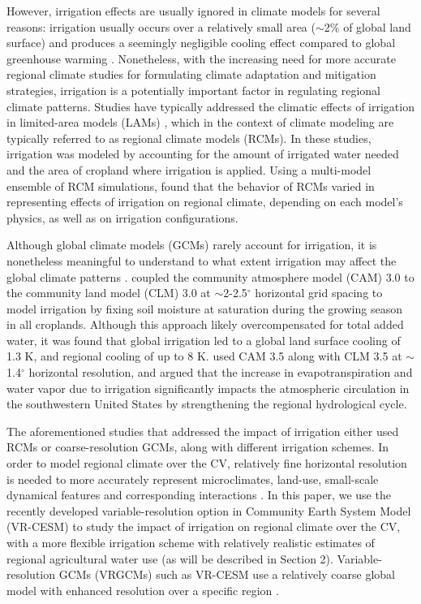 \documentclass[draft,ms]{agutex}   %
\begin{document}
\begin{article}
However, irrigation effects are usually ignored in climate models for several reasons: irrigation usually occurs over a relatively small area ($\sim$2$\%$ of global land surface) and produces a seemingly negligible cooling effect compared to global greenhouse warming \citep{boucher2004direct}. Nonetheless, with the increasing need for more accurate regional climate studies for formulating climate adaptation and mitigation strategies, irrigation is a potentially important factor in regulating regional climate patterns. Studies have typically addressed the climatic effects of irrigation in limited-area models (LAMs) \citep{snyder2006regional, kueppers2007irrigation}, which in the context of climate modeling are typically referred to as regional climate models (RCMs). In these studies, irrigation was modeled by accounting for the amount of irrigated water needed and the area of cropland where irrigation is applied. Using a multi-model ensemble of RCM simulations, \cite{kueppers2008seasonal} found that the behavior of RCMs varied in representing effects of irrigation on regional climate, depending on each model's physics, as well as on irrigation configurations.

Although global climate models (GCMs) rarely account for irrigation, it is nonetheless meaningful to understand to what extent irrigation may affect the global climate patterns \citep{sacks2009effects}. \citet{lobell2006biogeophysical} coupled the community atmosphere model (CAM) 3.0 to the community land model (CLM) 3.0 at $\sim$2-2.5$^\circ$ horizontal grid spacing to model irrigation by fixing soil moisture at saturation during the growing season in all croplands. Although this approach likely overcompensated for total added water, it was found that global irrigation led to a global land surface cooling of 1.3 K, and regional cooling of up to 8 K. \citet{lo2013irrigation} used CAM 3.5 along with CLM 3.5 at $\sim$1.4$^\circ$ horizontal resolution, and argued that the increase in evapotranspiration and water vapor due to irrigation significantly impacts the atmospheric circulation in the southwestern United States by strengthening the regional hydrological cycle.

The aforementioned studies that addressed the impact of irrigation either used RCMs or coarse-resolution GCMs, along with different irrigation schemes. In order to model regional climate over the CV, relatively fine horizontal resolution is needed to more accurately represent microclimates, land-use, small-scale dynamical features and corresponding interactions \citep{leung2003regional, rauscher2010resolution}. In this paper, we use the recently developed variable-resolution option in Community Earth System Model (VR-CESM) to study the impact of irrigation on regional climate over the CV, with a more flexible irrigation scheme with relatively realistic estimates of regional agricultural water use (as will be described in Section 2). Variable-resolution GCMs (VRGCMs) such as VR-CESM use a relatively coarse global model with enhanced resolution over a specific region \citep{staniforth1978variable, fox1997finite}. 



\end{article}
\end{document}
